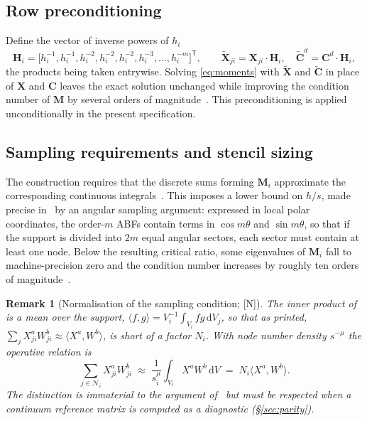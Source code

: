 \documentclass[11pt,a4paper]{article}
\newcommand{\New}{\textcolor{blue!60!black}{\textsf{[N]}}}
\newtheorem{remark}{Remark}
\begin{document}
\subsection{Row preconditioning}

Define the vector of inverse powers of $h_i$ \cite[Eq.~(9)]{KL2021}
\begin{equation}
\bm H_i=\bigl[h_i^{-1},h_i^{-1},h_i^{-2},h_i^{-2},h_i^{-2},h_i^{-3},\dots,
h_i^{-m}\bigr]^{\mathsf T},
\qquad
\widetilde{\bm X}_{ji}=\bm X_{ji}\!\cdot\!\bm H_i,
\quad
\widetilde{\bm C}^{d}=\bm C^{d}\!\cdot\!\bm H_i,
\label{eq:precond}
\end{equation}
the products being taken entrywise. Solving \eqref{eq:moments} with
$\widetilde{\bm X}$ and $\widetilde{\bm C}$ in place of $\bm X$ and $\bm C$ leaves the
exact solution unchanged while improving the condition number of $\bm M$ by several
orders of magnitude~\cite[\S 2]{KL2021}. This preconditioning is applied
unconditionally in the present specification.

\subsection{Sampling requirements and stencil sizing}
\label{sec:sampling}

The construction requires that the discrete sums forming $\bm M_i$ approximate the
corresponding continuous integrals~\cite[Eq.~(22)]{KLN2020}. This imposes a lower bound
on $h/s$, made precise in~\cite[\S 3.2]{KLN2020} by an angular sampling argument:
expressed in local polar coordinates, the order-$m$ ABFs contain terms in $\cos m\theta$
and $\sin m\theta$, so that if the support is divided into $2m$ equal angular sectors,
each sector must contain at least one node. Below the resulting critical ratio, some
eigenvalues of $\bm M_i$ fall to machine-precision zero and the condition number
increases by roughly ten orders of magnitude~\cite[\S 3.2]{KLN2020}.

\begin{remark}[Normalisation of the sampling condition; \New]
\label{rem:innerprod}
The inner product of \cite[Eq.~(18)]{KLN2020} is a \emph{mean} over the support,
$\langle f,g\rangle=V_i^{-1}\int_{V_i}fg\,\mathrm dV_j$, so that
\cite[Eq.~(22)]{KLN2020} as printed, $\sum_j X^{a}_{ji}W^{b}_{ji}\approx\langle
X^{a},W^{b}\rangle$, is short of a factor $N_i$. With node number density $s^{-\mu}$ the
operative relation is
\begin{equation}
\sum_{j\in\mathcal N_i}X^{a}_{ji}W^{b}_{ji}
\;\approx\;\frac{1}{s_i^{\mu}}\int_{V_i}X^{a}W^{b}\,\mathrm dV
\;=\;N_i\bigl\langle X^{a},W^{b}\bigr\rangle .
\label{eq:sampling-norm}
\end{equation}
The distinction is immaterial to the argument of~\cite{KLN2020} but must be respected
when a continuum reference matrix is computed as a diagnostic (\S\ref{sec:parity}).
\end{remark}
\end{document}
